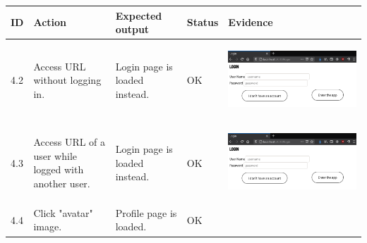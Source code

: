 \documentclass[12pt,twoside,titlepage,a4paper]{article}
\theoremstyle{definicion}
\theoremstyle{lema}
\theoremstyle{teorema}
\theoremstyle{corolario}
\theoremstyle{ejemplo}
\theoremstyle{nota}
\begin{document}
\begin{table}[!h]
	\centering
	\begin{tabular}{|m{0.6cm}|m{2.9cm}|m{3.6cm}|m{1.1cm}|m{5.9cm}|}
		\hline
		\textbf{ID} & \textbf{Action} & \textbf{Expected output} & \textbf{Status} & \textbf{Evidence} \\ 
		\hline
		4.2 & Access URL without logging in. & Login page is loaded instead. & OK &
		\begin{center}\includegraphics[scale=0.22]{register2-login1.png}\end{center} \\
		\hline
		4.3 & Access URL of a user while logged with another user. & Login page is loaded instead. & OK &
		\begin{center}\includegraphics[scale=0.22]{register2-login1.png}\end{center} \\
		\hline
		4.4 & Click "avatar" image. & Profile page is loaded. & OK &

\end{tabular}
\end{table}
\end{document}
